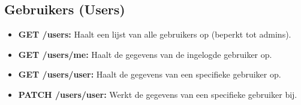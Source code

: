 \subsection{Gebruikers (Users)}

\begin{itemize}
\item \textbf{GET /users:} Haalt een lijst van alle gebruikers op (beperkt tot admins).
\item \textbf{GET /users/me:} Haalt de gegevens van de ingelogde gebruiker op.
\item \textbf{GET /users/{user}:} Haalt de gegevens van een specifieke gebruiker op.
\item \textbf{PATCH /users/{user}:} Werkt de gegevens van een specifieke gebruiker bij.
\end{itemize}

